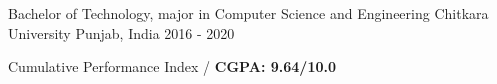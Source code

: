 


\begin{cventries}


\cventry
{Bachelor of Technology, major in Computer Science and Engineering} %
{Chitkara University} %
{Punjab, India} %
{2016 - 2020} %
{%
\begin{cvitems}
\item {Cumulative Performance Index /
    \textbf{CGPA: 9.64/10.0}}
\end{cvitems}
}

\end{cventries}

